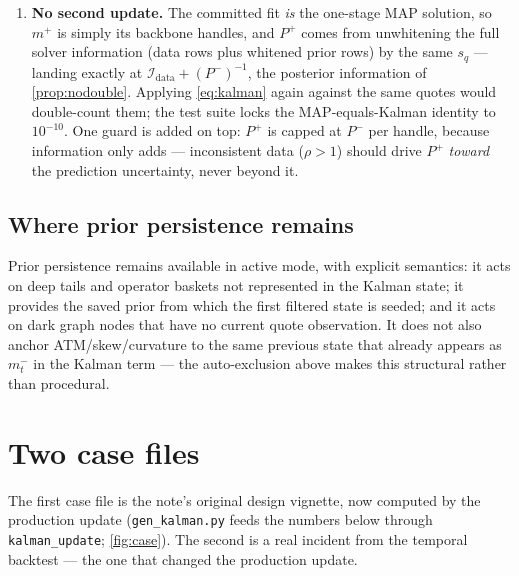 \documentclass[11pt]{article}
\newcommand{\calI}{\mathcal I}
\begin{document}
\begin{enumerate}[leftmargin=1.6em]
\item \textbf{No second update.} The committed fit \emph{is} the one-stage MAP
solution, so $m^+$ is simply its backbone handles, and $P^+$ comes from
unwhitening the full solver information (data rows plus whitened prior rows)
by the same $s_q$ --- landing exactly at
$\calI_{\mathrm{data}}+(P^-)^{-1}$, the posterior information of
\cref{prop:nodouble}. Applying \cref{eq:kalman} again against the same quotes
would double-count them; the test suite locks the MAP-equals-Kalman identity
to $10^{-10}$. One guard is added on top: $P^+$ is capped at $P^-$ per handle,
because information only adds --- inconsistent data ($\rho>1$) should drive
$P^+$ \emph{toward} the prediction uncertainty, never beyond it.
\end{enumerate}

\subsection{Where prior persistence remains}

Prior persistence remains available in active mode, with explicit semantics:
it acts on deep tails and operator baskets not represented in the Kalman
state; it provides the saved prior from which the first filtered state is
seeded; and it acts on dark graph nodes that have no current quote
observation. It does not also anchor ATM/skew/curvature to the same previous
state that already appears as $m_t^-$ in the Kalman term --- the auto-exclusion
above makes this structural rather than procedural.

\section{Two case files}
\label{sec:case}

The first case file is the note's original design vignette, now computed by
the production update (\texttt{gen\_kalman.py} feeds the numbers below through
\texttt{kalman\_update}; \cref{fig:case}). The second is a real incident from
the temporal backtest --- the one that changed the production update.
\end{document}
